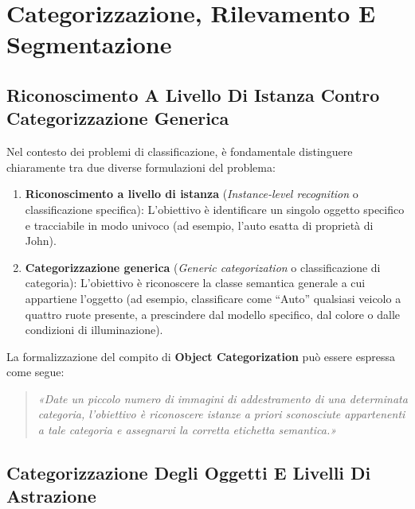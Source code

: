 ﻿\documentclass[11pt, a4paper]{article}
\begin{document}
\newpage

\section{Categorizzazione, Rilevamento E Segmentazione}

\subsection{Riconoscimento A Livello Di Istanza Contro Categorizzazione Generica}

Nel contesto dei problemi di classificazione, è fondamentale distinguere chiaramente tra due diverse formulazioni del problema:

\begin{enumerate}
    \item \textbf{Riconoscimento a livello di istanza} (\emph{Instance-level recognition} o classificazione specifica): L'obiettivo è identificare un singolo oggetto specifico e tracciabile in modo univoco (ad esempio, l'auto esatta di proprietà di John).


    \item \textbf{Categorizzazione generica} (\emph{Generic categorization} o classificazione di categoria): L'obiettivo è riconoscere la classe semantica generale a cui appartiene l'oggetto (ad esempio, classificare come ``Auto'' qualsiasi veicolo a quattro ruote presente, a prescindere dal modello specifico, dal colore o dalle condizioni di illuminazione).

\end{enumerate}

La formalizzazione del compito di \textbf{Object Categorization} può essere espressa come segue:
\begin{quote}
\itshape
«Date un piccolo numero di immagini di addestramento di una determinata categoria, l'obiettivo è riconoscere istanze a priori sconosciute appartenenti a tale categoria e assegnarvi la corretta etichetta semantica.»
\end{quote}

\subsection{Categorizzazione Degli Oggetti E Livelli Di Astrazione}
\end{document}
